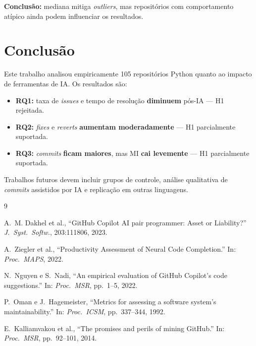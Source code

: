 \documentclass[12pt,a4paper,twocolumn]{article}
\begin{document}
\textbf{Conclusão:} mediana mitiga \textit{outliers}, mas repositórios com
comportamento atípico ainda podem influenciar os resultados.

\section{Conclusão}

Este trabalho analisou empiricamente 105 repositórios Python quanto ao impacto
de ferramentas de IA. Os resultados são:

\begin{itemize}[leftmargin=1.2em,itemsep=2pt,topsep=2pt]
  \item \textbf{RQ1:} taxa de \textit{issues} e tempo de resolução
    \textbf{diminuem} pós-IA — H1 rejeitada.
  \item \textbf{RQ2:} \textit{fixes} e \textit{reverts} \textbf{aumentam
    moderadamente} — H1 parcialmente suportada.
  \item \textbf{RQ3:} \textit{commits} \textbf{ficam maiores}, mas MI
    \textbf{cai levemente} — H1 parcialmente suportada.
\end{itemize}

Trabalhos futuros devem incluir grupos de controle, análise qualitativa de
\textit{commits} assistidos por IA e replicação em outras linguagens.


\begin{thebibliography}{9}

  A.~M. Dakhel et al.,
  ``GitHub Copilot AI pair programmer: Asset or Liability?''
  \textit{J.\ Syst.\ Softw.}, 203:111806, 2023.

  A.~Ziegler et al.,
  ``Productivity Assessment of Neural Code Completion.''
  In: \textit{Proc.\ MAPS}, 2022.

  N.~Nguyen e S.~Nadi,
  ``An empirical evaluation of GitHub Copilot's code suggestions.''
  In: \textit{Proc.\ MSR}, pp.\ 1--5, 2022.

  P.~Oman e J.~Hagemeister,
  ``Metrics for assessing a software system's maintainability.''
  In: \textit{Proc.\ ICSM}, pp.\ 337--344, 1992.

  E.~Kalliamvakou et al.,
  ``The promises and perils of mining GitHub.''
  In: \textit{Proc.\ MSR}, pp.\ 92--101, 2014.

\end{thebibliography}
\end{document}
